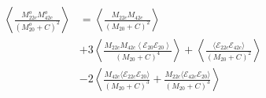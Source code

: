 \begin{equation}
\begin{split}
    \left\langle \frac{M^o_{22c}M^o_{42c}}{(M^o_{20}+C)^2}\right\rangle
    &= \left\langle \frac{M_{22c}M_{42c}}{(M_{20}+C)^2}\right\rangle\\
    &+3\left\langle\frac{M_{22c}M_{42c}
        \left\langle\mathcal{E}_{20}\mathcal{E}_{20}\right\rangle}
                    {(M_{20}+C)^4}
    \right\rangle
    + \left\langle
        \frac{\langle\mathcal{E}_{22c}\mathcal{E}_{42c}\rangle}{(M_{20}+C)^2}
        \right\rangle\\
    &- 2\left\langle\frac{M_{42c}\langle\mathcal{E}_{22c}\mathcal{E}_{20}\rangle}
        {(M_{20}+C)^3}
        + \frac{M_{22c}\langle\mathcal{E}_{42c}\mathcal{E}_{20}\rangle}
        {(M_{20}+C)^3}\right\rangle\\
\end{split}
\end{equation}

